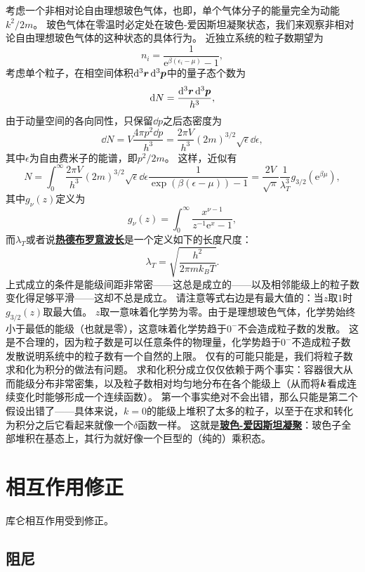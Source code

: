 \documentclass[hyperref, UTF8, a4paper]{ctexart}
\newcommand*{\ee}{\mathrm{e}}
\newcommand{\concept}[1]{\underline{\textbf{#1}}}
\begin{document}
考虑一个非相对论自由理想玻色气体，也即，单个气体分子的能量完全为动能$k^2/2m$。
玻色气体在零温时必定处在玻色-爱因斯坦凝聚状态，我们来观察非相对论自由理想玻色气体的这种状态的具体行为。
近独立系统的粒子数期望为
\[
    n_i = \frac{1}{\ee^{\beta(\epsilon_i - \mu)} - 1},
\]
考虑单个粒子，在相空间体积$\dd[3]{\vb*{r}} \dd[3]{\vb*{p}}$中的量子态个数为
\[
    \dd{N} = \frac{\dd[3]{\vb*{r}} \dd[3]{\vb*{p}}}{h^3},
\]
由于动量空间的各向同性，只保留$\dd{p}$之后态密度为
\[
    \dd{N} = V \frac{4\pi p^2 \dd{p}}{h^3} = \frac{2\pi V}{h^3} (2m)^{3/2} \sqrt{\epsilon} \dd{\epsilon},
\]
其中$\epsilon$为自由费米子的能谱，即$p^2/2m$。
这样，近似有
\begin{equation}
    N = \int_0^\infty \frac{2\pi V}{h^3} (2m)^{3/2} \sqrt{\epsilon} \dd{\epsilon} \frac{1}{\exp(\beta (\epsilon - \mu)) - 1} = \frac{2V}{\sqrt{\pi}} \frac{1}{\lambda_T^3} g_{3/2}(\ee^{\beta \mu}),
\end{equation}
其中$g_\nu(z)$定义为
\[
    g_\nu(z) = \int_0^\infty \frac{x^{\nu-1}}{z^{-1} \ee^{x} - 1},
\]
而$\lambda_T$或者说\concept{热德布罗意波长}是一个定义如下的长度尺度：
\begin{equation}
    \lambda_T = \sqrt{\frac{h^2}{2\pi m k_B T}}.
\end{equation}
上式成立的条件是能级间距非常密——这总是成立的——以及相邻能级上的粒子数变化得足够平滑——这却不总是成立。
请注意等式右边是有最大值的：当$z$取$1$时$g_{3/2}(z)$取最大值。
$z$取一意味着化学势为零。由于是理想玻色气体，化学势始终小于最低的能级（也就是零），这意味着化学势趋于$0^-$不会造成粒子数的发散。
这是不合理的，因为粒子数是可以任意条件的物理量，化学势趋于$0^-$不造成粒子数发散说明系统中的粒子数有一个自然的上限。
仅有的可能只能是，我们将粒子数求和化为积分的做法有问题。
求和化积分成立仅仅依赖于两个事实：容器很大从而能级分布非常密集，以及粒子数相对均匀地分布在各个能级上（从而将$\vb*{k}$看成连续变化时能够形成一个连续函数）。
第一个事实绝对不会出错，那么只能是第二个假设出错了——具体来说，$k=0$的能级上堆积了太多的粒子，以至于在求和转化为积分之后它看起来就像一个$\delta$函数一样。
这就是\concept{玻色-爱因斯坦凝聚}：玻色子全部堆积在基态上，其行为就好像一个巨型的（纯的）乘积态。

\section{相互作用修正}

库仑相互作用受到修正。

\subsection{阻尼}
\end{document}

